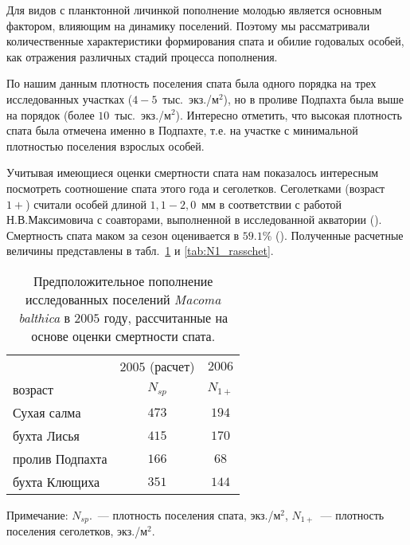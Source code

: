 Для видов с планктонной личинкой пополнение молодью является основным фактором, влияющим на динамику поселений.
Поэтому мы рассматривали количественные характеристики формирования спата и обилие годовалых особей, как отражения различных стадий процесса пополнения.

По нашим данным плотность поселения спата была одного порядка на трех исследованных участках ($4-5$~тыс.~экз./м$^2$), но в проливе Подпахта была выше на порядок (более $10$~тыс.~экз./м$^2$). 
Интересно отметить, что высокая плотность спата была отмечена именно в Подпахте, т.е. на участке с минимальной плотностью поселения взрослых особей. 

Учитывая имеющиеся оценки смертности спата нам показалось интересным посмотреть соотношение спата этого года и сеголетков. 
Сеголетками (возраст $1+$) считали особей длиной $1,1-2,0$~мм в соответствии с работой Н.В.Максимовича с соавторами, выполненной в исследованной акватории (\cite{Maximovich_et_al_1992}). 
Смертность спата маком за сезон оценивается в $59.1$\% (\cite{Burkovskiy_et_al_1998}). Полученные расчетные величины представлены в табл.~\ref{tab:spat_rasschet} и \ref{tab:N1_rasschet}.

\begin{table}[p]
\caption{Предположительное пополнение исследованных поселений \textit{Macoma balthica} в $2005$ году, рассчитанные на основе оценки смертности спата.}
\label{tab:spat_rasschet}
\begin{center}
\begin{tabular}{|l|c|c|}
\hline
                & $2005$ (расчет) & $2006$ \\ 
возраст         & $N_{sp}$      & $N_{1+}$  \\ \hline
Сухая салма     & $473$           & $194$  \\ \hline
бухта Лисья     & $415$           & $170$  \\ \hline
пролив Подпахта & $166$           & $68$   \\ \hline
бухта Клющиха   & $351$           & $144$  \\ \hline
\end{tabular}
\end{center}
	\footnotesize{Примечание: $N_{sp}$.~--- плотность поселения спата, экз./м$^2$, $N_{1+}$~--- плотность поселения сеголетков, экз./м$^2$.}

\end{table}


